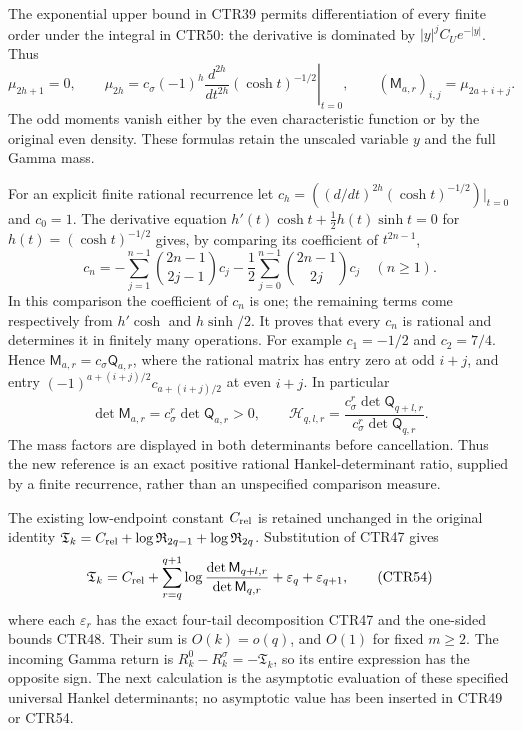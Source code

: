 The exponential upper bound in CTR39 permits differentiation of every
finite order under the integral in CTR50: the derivative is dominated
by $|y|^jC_Ue^{-|y|}$. Thus
\[
 \mu_{2h+1}=0,\qquad
 \mu_{2h}
  =c_\sigma(-1)^h
     \left.\frac{d^{2h}}{dt^{2h}}(\cosh t)^{-1/2}\right|_{t=0},
 \qquad
 (\mathsf M_{a,r})_{i,j}=\mu_{2a+i+j}.
 \tag{CTR51}
\]
The odd moments vanish either by the even characteristic function or
by the original even density. These formulas retain the unscaled
variable $y$ and the full Gamma mass.

For an explicit finite rational recurrence let
$c_h=((d/dt)^{2h}(\cosh t)^{-1/2})|_{t=0}$ and $c_0=1$.
The derivative equation
$h'(t)\cosh t+\tfrac12h(t)\sinh t=0$ for $h(t)=(\cosh t)^{-1/2}$
gives, by comparing its coefficient of $t^{2n-1}$,
\[
 c_n=
 -\sum_{j=1}^{n-1}\binom{2n-1}{2j-1}c_j
 -\frac12\sum_{j=0}^{n-1}\binom{2n-1}{2j}c_j
 \quad(n\geq1).
 \tag{CTR52}
\]
In this comparison the coefficient of $c_n$ is one; the remaining
terms come respectively from $h'\cosh$ and $h\sinh/2$.
It proves that every $c_n$ is rational and determines it in finitely
many operations. For example $c_1=-1/2$ and $c_2=7/4$.
Hence $\mathsf M_{a,r}=c_\sigma\mathsf Q_{a,r}$, where the rational
matrix has entry zero at odd $i+j$, and entry
$(-1)^{a+(i+j)/2}c_{a+(i+j)/2}$ at even $i+j$.
In particular
\[
 \det\mathsf M_{a,r}=c_\sigma^r\det\mathsf Q_{a,r}>0,\qquad
 \mathcal H_{q,l,r}
   =\frac{c_\sigma^r\det\mathsf Q_{q+l,r}}
          {c_\sigma^r\det\mathsf Q_{q,r}} .
 \tag{CTR53}
\]
The mass factors are displayed in both determinants before cancellation.
Thus the new reference is an exact positive rational Hankel-determinant
ratio, supplied by a finite recurrence, rather than an unspecified
comparison measure.

The existing low-endpoint constant $C_{\rm rel}$ is retained unchanged
in the original identity
$\mathfrak T_k=C_{\rm rel}+\log\mathfrak R_{2q-1}
                              +\log\mathfrak R_{2q}$.
Substitution of CTR47 gives
\[
 \mathfrak T_k=C_{\rm rel}
      +\sum_{r=q}^{q+1}
          \log\frac{\det\mathsf M_{q+l,r}}{\det\mathsf M_{q,r}}
      +\varepsilon_q+\varepsilon_{q+1},
 \tag{CTR54}
\]
where each $\varepsilon_r$ has the exact four-tail decomposition
CTR47 and the one-sided bounds CTR48. Their sum is $O(k)=o(q)$,
and $O(1)$ for fixed $m\geq2$. The incoming Gamma return is
$R_k^0-R_k^\sigma=-\mathfrak T_k$, so its entire expression has the
opposite sign. The next calculation is the asymptotic evaluation of
these specified universal Hankel determinants; no asymptotic value
has been inserted in CTR49 or CTR54.
